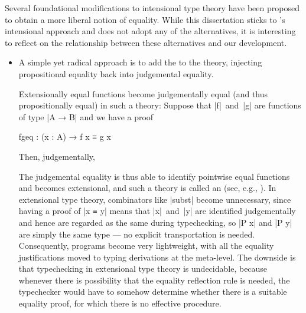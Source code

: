 Several foundational modifications to intensional type theory have been proposed to obtain a more liberal notion of equality.
While this dissertation sticks to \Agda's intensional approach and does not adopt any of the alternatives, it is interesting to reflect on the relationship between these alternatives and our development.
\begin{itemize}
\item A simple yet radical approach is to add the  to the theory, injecting propositional equality back into judgemental equality.
\begin{center}
\DP
\end{center}
Extensionally equal functions become judgementally equal (and thus propositionally equal) in such a theory:
Suppose that |f|~and~|g| are functions of type |A → B| and we have a proof
\begin{code}
fgeq : (x : A) → f x ≡ g x
\end{code}
Then, judgementally,
The judgemental equality is thus able to identify pointwise equal functions and becomes extensional, and such a theory is called an  (see, e.g., \citet[Section~8.2]{Nordstrom-programming}).
In extensional type theory, combinators like |subst| become unnecessary, since having a proof of |x ≡ y| means that |x|~and~|y| are identified judgementally and hence are regarded as the same during typechecking, so |P x| and |P y| are simply the same type --- no explicit transportation is needed.
Consequently, programs become very lightweight, with all the equality justifications moved to typing derivations at the meta-level.
The downside is that typechecking in extensional type theory is undecidable, because whenever there is possibility that the equality reflection rule is needed, the typechecker would have to somehow determine whether there is a suitable equality proof, for which there is no effective procedure.

\end{itemize}
